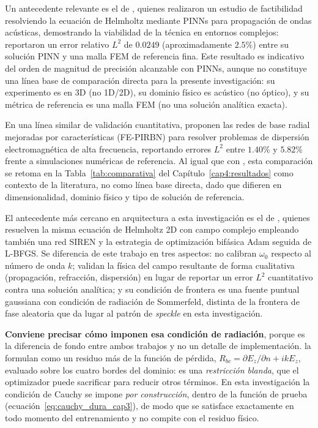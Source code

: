 Un antecedente relevante es el de \textcite{schoder2024helmholtz}, quienes
realizaron un estudio de factibilidad resolviendo la ecuación de Helmholtz
mediante PINNs para propagación de ondas acústicas, demostrando la viabilidad
de la técnica en entornos complejos: reportaron un error relativo $L^2$ de
$0.0249$ (aproximadamente $2.5\%$) entre su solución PINN y una malla FEM de
referencia fina. Este resultado es indicativo del orden de magnitud de
precisión alcanzable con PINNs, aunque no constituye una línea base de
comparación directa para la presente investigación: su experimento es en 3D
(no 1D/2D), su dominio físico es acústico (no óptico), y su métrica de
referencia es una malla FEM (no una solución analítica exacta).

En una línea similar de validación cuantitativa, \textcite{zhang2025fepirbn}
proponen las redes de base radial mejoradas por características (FE-PIRBN)
para resolver problemas de dispersión electromagnética de alta frecuencia,
reportando errores $L^2$ entre $1.40\%$ y $5.82\%$ frente a simulaciones
numéricas de referencia. Al igual que con \textcite{schoder2024helmholtz},
esta comparación se retoma en la Tabla~\ref{tab:comparativa} del
Capítulo~\ref{cap4:resultados} como contexto de la literatura, no como línea
base directa, dado que difieren en dimensionalidad, dominio físico y tipo de
solución de referencia.

El antecedente más cercano en arquitectura a esta investigación es el de
\textcite{panagiotakopoulos2026helmholtz}, quienes resuelven la misma
ecuación de Helmholtz 2D con campo complejo empleando también una red SIREN
y la estrategia de optimización bifásica Adam seguida de L-BFGS. Se
diferencia de este trabajo en tres aspectos: no calibran $\omega_0$ respecto
al número de onda $k$; validan la física del campo resultante de forma
cualitativa (propagación, refracción, dispersión) en lugar de reportar un
error $L^2$ cuantitativo contra una solución analítica; y su condición de
frontera es una fuente puntual gaussiana con condición de radiación de
Sommerfeld, distinta de la frontera de fase aleatoria que da lugar al patrón
de \textit{speckle} en esta investigación.

\textbf{Conviene precisar cómo imponen esa condición de radiación}, porque es
la diferencia de fondo entre ambos trabajos y no un detalle de implementación.
\textcite{panagiotakopoulos2026helmholtz} la formulan como un residuo más de la
función de pérdida, $R_{bc}=\partial E_z/\partial n + ikE_z$, evaluado sobre los
cuatro bordes del dominio: es una \emph{restricción blanda}, que el optimizador
puede sacrificar para reducir otros términos. En esta investigación la condición
de Cauchy se impone \emph{por construcción}, dentro de la función de prueba
(ecuación~\eqref{eq:cauchy_dura_cap3}), de modo que se satisface exactamente en
todo momento del entrenamiento y no compite con el residuo físico.


